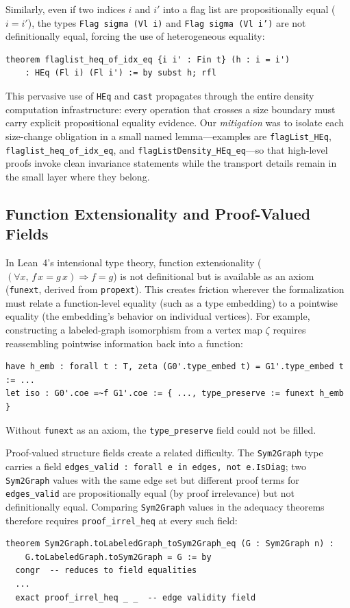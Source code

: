 \documentclass{article}
\newcommand{\lean}[1]{\texttt{#1}}
\begin{document}
Similarly, even if two indices $i$ and $i'$ into a flag list are
propositionally equal ($i = i'$), the types \lean{Flag sigma (Vl i)} and
\lean{Flag sigma (Vl i')} are not definitionally equal, forcing the use of
heterogeneous equality:
\begin{lstlisting}
theorem flaglist_heq_of_idx_eq {i i' : Fin t} (h : i = i')
    : HEq (Fl i) (Fl i') := by subst h; rfl
\end{lstlisting}
This pervasive use of \lean{HEq} and \lean{cast} propagates through the entire
density computation infrastructure: every operation that crosses a size
boundary must carry explicit propositional equality evidence.  Our
\emph{mitigation} was to isolate each size-change obligation in a small named
lemma---examples are \lean{flagList\_HEq},
\lean{flaglist\_heq\_of\_idx\_eq}, and \lean{flagListDensity\_HEq\_eq}---so
that high-level proofs invoke clean invariance statements while the transport
details remain in the small layer where they belong.

\subsection{Function Extensionality and Proof-Valued Fields}

In Lean~4's intensional type theory, function extensionality
($(\forall x,\, f\,x = g\,x) \Rightarrow f = g$) is not definitional but is
available as an axiom (\lean{funext}, derived from \lean{propext}).  This
creates friction wherever the formalization must relate a function-level
equality (such as a type embedding) to a pointwise equality (the embedding's
behavior on individual vertices).  For example, constructing a labeled-graph
isomorphism from a vertex map $\zeta$ requires reassembling pointwise
information back into a function:
\begin{lstlisting}
have h_emb : forall t : T, zeta (G0'.type_embed t) = G1'.type_embed t := ...
let iso : G0'.coe =~f G1'.coe := { ..., type_preserve := funext h_emb }
\end{lstlisting}
Without \lean{funext} as an axiom, the \lean{type\_preserve} field could not
be filled.

Proof-valued structure fields create a related difficulty.  The
\lean{Sym2Graph} type carries a field
\lean{edges\_valid : forall e in edges, not e.IsDiag}; two \lean{Sym2Graph}
values with the same edge set but different proof terms for
\lean{edges\_valid} are propositionally equal (by proof irrelevance) but not
definitionally equal.  Comparing \lean{Sym2Graph} values in the adequacy
theorems therefore requires \lean{proof\_irrel\_heq} at every such field:
\begin{lstlisting}
theorem Sym2Graph.toLabeledGraph_toSym2Graph_eq (G : Sym2Graph n) :
    G.toLabeledGraph.toSym2Graph = G := by
  congr  -- reduces to field equalities
  ...
  exact proof_irrel_heq _ _  -- edge validity field
\end{lstlisting}
\end{document}
